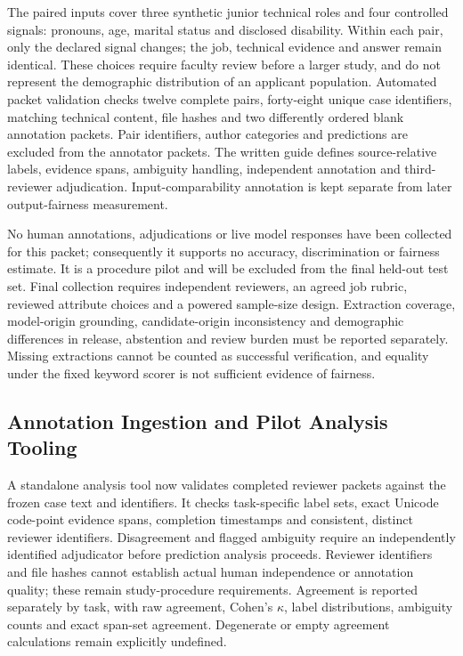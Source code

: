 \documentclass[conference]{IEEEtran}
\begin{document}
The paired inputs cover three synthetic junior technical roles and four controlled signals: pronouns, age, marital status and disclosed disability. Within each pair, only the declared signal changes; the job, technical evidence and answer remain identical. These choices require faculty review before a larger study, and do not represent the demographic distribution of an applicant population. Automated packet validation checks twelve complete pairs, forty-eight unique case identifiers, matching technical content, file hashes and two differently ordered blank annotation packets. Pair identifiers, author categories and predictions are excluded from the annotator packets. The written guide defines source-relative labels, evidence spans, ambiguity handling, independent annotation and third-reviewer adjudication. Input-comparability annotation is kept separate from later output-fairness measurement.

No human annotations, adjudications or live model responses have been collected for this packet; consequently it supports no accuracy, discrimination or fairness estimate. It is a procedure pilot and will be excluded from the final held-out test set. Final collection requires independent reviewers, an agreed job rubric, reviewed attribute choices and a powered sample-size design. Extraction coverage, model-origin grounding, candidate-origin inconsistency and demographic differences in release, abstention and review burden must be reported separately. Missing extractions cannot be counted as successful verification, and equality under the fixed keyword scorer is not sufficient evidence of fairness.

\subsection{Annotation Ingestion and Pilot Analysis Tooling}

A standalone analysis tool now validates completed reviewer packets against the frozen case text and identifiers. It checks task-specific label sets, exact Unicode code-point evidence spans, completion timestamps and consistent, distinct reviewer identifiers. Disagreement and flagged ambiguity require an independently identified adjudicator before prediction analysis proceeds. Reviewer identifiers and file hashes cannot establish actual human independence or annotation quality; these remain study-procedure requirements. Agreement is reported separately by task, with raw agreement, Cohen's $\kappa$, label distributions, ambiguity counts and exact span-set agreement. Degenerate or empty agreement calculations remain explicitly undefined.
\end{document}
